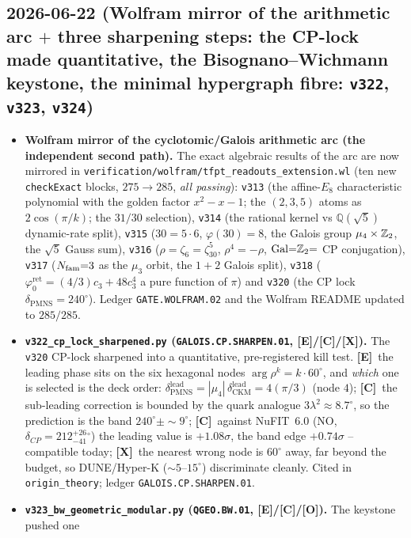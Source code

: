 \documentclass[11pt]{article}
\providecommand{\mE}{\textbf{[E]}}\providecommand{\mC}{\textbf{[C]}}
\providecommand{\mO}{\textbf{[O]}}\providecommand{\mX}{\textbf{[X]}}
\providecommand{\cthree}{c_3}\providecommand{\phiz}{\varphi_0^{\mathrm{ret}}}
\begin{document}
\subsection*{2026-06-22 (Wolfram mirror of the arithmetic arc $+$ three sharpening steps: the CP-lock made quantitative, the Bisognano--Wichmann keystone, the minimal hypergraph fibre: \texttt{v322}, \texttt{v323}, \texttt{v324})}
\begin{itemize}
\item \textbf{Wolfram mirror of the cyclotomic/Galois arithmetic arc (the independent second path).} The exact
  algebraic results of the arc are now mirrored in \texttt{verification/wolfram/tfpt\_readouts\_extension.wl} (ten new
  \texttt{checkExact} blocks, $275\to285$, \emph{all passing}): \texttt{v313} (the affine-$E_8$ characteristic
  polynomial with the golden factor $x^2{-}x{-}1$; the $(2,3,5)$ atoms as
  $2\cos(\pi/k)$; the $31/30$ selection), \texttt{v314} (the rational kernel vs $\mathbb Q(\sqrt5)$
  dynamic-rate split), \texttt{v315} ($30{=}5{\cdot}6$, $\varphi(30){=}8$, the Galois group $\mu_4\times\mathbb{Z}_2$, the
  $\sqrt5$ Gauss sum), \texttt{v316} ($\rho{=}\zeta_6{=}\zeta_{30}^5$, $\rho^4{=}-\rho$, $\mathrm{Gal}{=}\mathbb{Z}_2{=}$ CP
  conjugation), \texttt{v317} ($N_{\mathrm{fam}}{=}3$ as the $\mu_3$ orbit, the $1{+}2$ Galois split), \texttt{v318}
  ($\phiz{=}(4/3)\cthree{+}48\cthree^4$ a pure function of $\pi$) and \texttt{v320} (the CP lock
  $\delta_{\mathrm{PMNS}}{=}240^\circ$). Ledger \texttt{GATE.WOLFRAM.02} and the Wolfram README updated to $285/285$.
\item \textbf{\texttt{v322\_cp\_lock\_sharpened.py} (\texttt{GALOIS.CP.SHARPEN.01}, \mE/\mC/\mX).} The \texttt{v320}
  CP-lock sharpened into a quantitative, pre-registered kill test. \mE\ the leading phase sits on the six hexagonal
  nodes $\arg\rho^k{=}k\cdot60^\circ$, and \emph{which} one is selected is the deck order:
  $\delta_{\mathrm{PMNS}}^{\mathrm{lead}}{=}|\mu_4|\,\delta_{\mathrm{CKM}}^{\mathrm{lead}}{=}4(\pi/3)$ (node $4$);
  \mC\ the sub-leading correction is bounded by the quark analogue $3\lambda^2\approx8.7^\circ$, so the prediction is
  the band $240^\circ\pm\sim9^\circ$; \mC\ against NuFIT~6.0 (NO, $\delta_{CP}{=}212^{+26}_{-41}{}^\circ$) the leading
  value is $+1.08\sigma$, the band edge $+0.74\sigma$ -- compatible today; \mX\ the nearest wrong node is $60^\circ$
  away, far beyond the budget, so DUNE/Hyper-K ($\sim5$--$15^\circ$) discriminate cleanly. Cited in
  \texttt{origin\_theory}; ledger \texttt{GALOIS.CP.SHARPEN.01}.
\item \textbf{\texttt{v323\_bw\_geometric\_modular.py} (\texttt{QGEO.BW.01}, \mE/\mC/\mO).} The keystone pushed one

\end{itemize}
\end{document}
